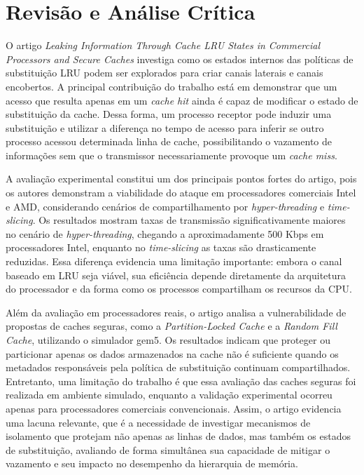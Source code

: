\documentclass[12pt]{article}
\begin{document}
\section{Revisão e Análise Crítica}

O artigo \textit{Leaking Information Through Cache LRU States in Commercial Processors and Secure Caches}\cite{9354935} investiga como os estados internos das políticas de substituição LRU podem ser explorados para criar canais laterais e canais encobertos. A principal contribuição do trabalho está em demonstrar que um acesso que resulta apenas em um \textit{cache hit} ainda é capaz de modificar o estado de substituição da cache. Dessa forma, um processo receptor pode induzir uma substituição e utilizar a diferença no tempo de acesso para inferir se outro processo acessou determinada linha de cache, possibilitando o vazamento de informações sem que o transmissor necessariamente provoque um \textit{cache miss}.

A avaliação experimental constitui um dos principais pontos fortes do artigo, pois os autores demonstram a viabilidade do ataque em processadores comerciais Intel e AMD, considerando cenários de compartilhamento por \textit{hyper-threading} e \textit{time-slicing}. Os resultados mostram taxas de transmissão significativamente maiores no cenário de \textit{hyper-threading}, chegando a aproximadamente 500 Kbps em processadores Intel, enquanto no \textit{time-slicing} as taxas são drasticamente reduzidas. Essa diferença evidencia uma limitação importante: embora o canal baseado em LRU seja viável, sua eficiência depende diretamente da arquitetura do processador e da forma como os processos compartilham os recursos da CPU.

Além da avaliação em processadores reais, o artigo analisa a vulnerabilidade de propostas de caches seguras, como a \textit{Partition-Locked Cache} e a \textit{Random Fill Cache}, utilizando o simulador gem5. Os resultados indicam que proteger ou particionar apenas os dados armazenados na cache não é suficiente quando os metadados responsáveis pela política de substituição continuam compartilhados. Entretanto, uma limitação do trabalho é que essa avaliação das caches seguras foi realizada em ambiente simulado, enquanto a validação experimental ocorreu apenas para processadores comerciais convencionais. Assim, o artigo evidencia uma lacuna relevante, que é a necessidade de investigar mecanismos de isolamento que protejam não apenas as linhas de dados, mas também os estados de substituição, avaliando de forma simultânea sua capacidade de mitigar o vazamento e seu impacto no desempenho da hierarquia de memória.
\end{document}
